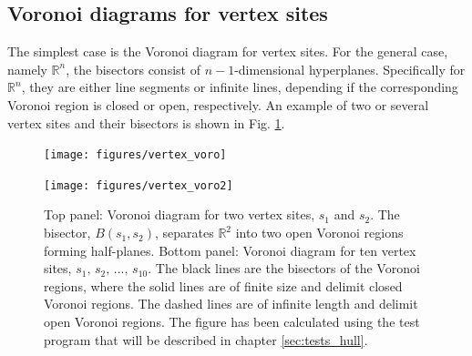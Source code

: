 \subsection{Voronoi diagrams for vertex sites}
The simplest case is the Voronoi diagram for vertex sites.
For the general case, namely $\mathbb{R}^n$, the bisectors consist of $n-1$-dimensional hyperplanes. 
Specifically for $\mathbb{R}^n$, they are either line segments or infinite lines, depending if the 
corresponding Voronoi region is closed or open, respectively.
An example of two or several vertex sites and their bisectors is shown in Fig. \ref{fig:vertex_voro}.

\begin{figure}[htb]
	\begin{minipage}{1 \textwidth}
		\begin{center}
			\texttt{[image: figures/vertex\_voro]}
		\end{center}
		\vspace{0.5cm}
		\begin{center}
			\texttt{[image: figures/vertex\_voro2]}
		\end{center}
	\end{minipage}
	\caption[Voronoi diagrams for vertices.]{
		Top panel: Voronoi diagram for two vertex sites, $s_1$ and $s_2$. 
			The bisector, $B\left(s_1, s_2\right)$, separates $\mathbb{R}^2$ 
			into two open Voronoi regions forming half-planes.
		Bottom panel: Voronoi diagram for ten vertex sites, $s_1,\, s_2,\, ...,\, s_{10}$.
		The black lines are the bisectors of the Voronoi regions, where the solid lines are of finite size
		and delimit closed Voronoi regions. The dashed lines are of infinite length and delimit open Voronoi regions.
		The figure has been calculated using the test program that will be described in chapter \ref{sec:tests_hull}.
		\label{fig:vertex_voro}}
\end{figure}


